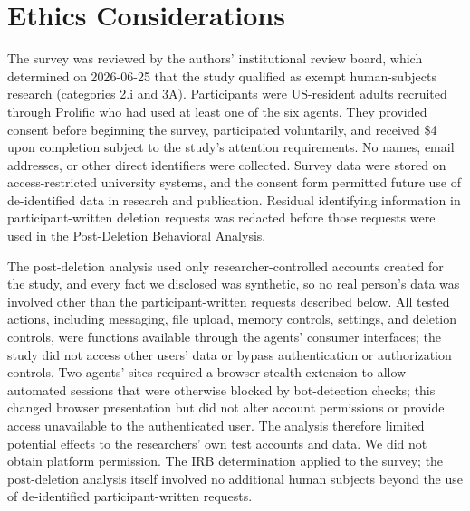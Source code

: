 \section*{Ethics Considerations}
\label{sec:ethics}


The survey was reviewed by the authors' institutional review board, which determined on 2026-06-25 that the study qualified as exempt human-subjects research (categories 2.i and 3A). Participants were US-resident adults recruited through Prolific who had used at least one of the six agents. They provided consent before beginning the survey, participated voluntarily, and received \$4 upon completion subject to the study's attention requirements. No names, email addresses, or other direct identifiers were collected. Survey data were stored on access-restricted university systems, and the consent form permitted future use of de-identified data in research and publication. Residual identifying information in participant-written deletion requests was redacted before those requests were used in the Post-Deletion Behavioral Analysis.

The post-deletion analysis used only researcher-controlled accounts created for the study, and every fact we disclosed was synthetic, so no real person's data was involved other than the participant-written requests described below. All tested actions, including messaging, file upload, memory controls, settings, and deletion controls, were functions available through the agents' consumer interfaces; the study did not access other users' data or bypass authentication or authorization controls. Two agents' sites required a browser-stealth extension to allow automated sessions that were otherwise blocked by bot-detection checks; this changed browser presentation but did not alter account permissions or provide access unavailable to the authenticated user. The analysis therefore limited potential effects to the researchers' own test accounts and data. We did not obtain platform permission. The IRB determination applied to the survey; the post-deletion analysis itself involved no additional human subjects beyond the use of de-identified participant-written requests.
